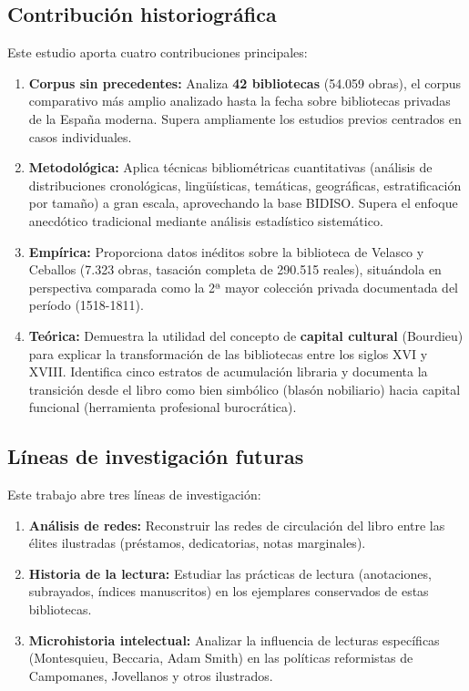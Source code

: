 \documentclass[12pt,a4paper]{article}
\begin{document}
\subsection{Contribución historiográfica}

Este estudio aporta cuatro contribuciones principales:

\begin{enumerate}
\item \textbf{Corpus sin precedentes:} Analiza \textbf{42 bibliotecas} (54.059 obras), el corpus comparativo más amplio analizado hasta la fecha sobre bibliotecas privadas de la España moderna. Supera ampliamente los estudios previos centrados en casos individuales.

\item \textbf{Metodológica:} Aplica técnicas bibliométricas cuantitativas (análisis de distribuciones cronológicas, lingüísticas, temáticas, geográficas, estratificación por tamaño) a gran escala, aprovechando la base BIDISO. Supera el enfoque anecdótico tradicional mediante análisis estadístico sistemático.

\item \textbf{Empírica:} Proporciona datos inéditos sobre la biblioteca de Velasco y Ceballos (7.323 obras, tasación completa de 290.515 reales), situándola en perspectiva comparada como la 2ª mayor colección privada documentada del período (1518-1811).

\item \textbf{Teórica:} Demuestra la utilidad del concepto de \textbf{capital cultural} (Bourdieu) para explicar la transformación de las bibliotecas entre los siglos XVI y XVIII. Identifica cinco estratos de acumulación libraria y documenta la transición desde el libro como bien simbólico (blasón nobiliario) hacia capital funcional (herramienta profesional burocrática).
\end{enumerate}

\subsection{Líneas de investigación futuras}

Este trabajo abre tres líneas de investigación:

\begin{enumerate}
\item \textbf{Análisis de redes:} Reconstruir las redes de circulación del libro entre las élites ilustradas (préstamos, dedicatorias, notas marginales).

\item \textbf{Historia de la lectura:} Estudiar las prácticas de lectura (anotaciones, subrayados, índices manuscritos) en los ejemplares conservados de estas bibliotecas.

\item \textbf{Microhistoria intelectual:} Analizar la influencia de lecturas específicas (Montesquieu, Beccaria, Adam Smith) en las políticas reformistas de Campomanes, Jovellanos y otros ilustrados.
\end{enumerate}
\end{document}
